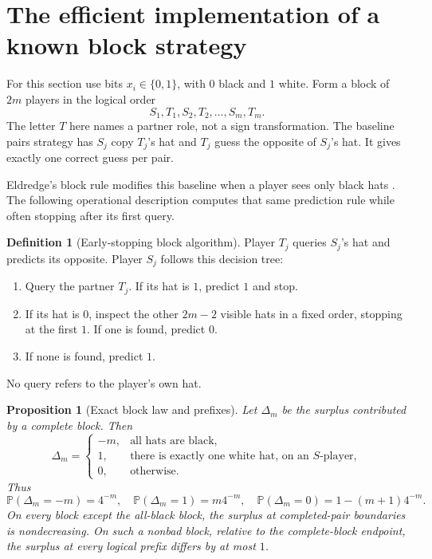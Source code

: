 \documentclass[11pt,letterpaper]{article}
\newtheorem{proposition}[theorem]{Proposition}
\theoremstyle{definition}
\newtheorem{definition}[theorem]{Definition}
\newcommand{\Prb}{\mathbb P}
\begin{document}
\section{The efficient implementation of a known block strategy}
\label{mbg:qry:sec:block}

For this section use bits \(x_i\in\{0,1\}\), with \(0\) black and \(1\)
white. Form a block of \(2m\) players in the logical order
\[
 S_1,T_1,S_2,T_2,\ldots,S_m,T_m.
\]
The letter \(T\) here names a partner role, not a sign transformation.
The baseline pairs strategy has \(S_j\) copy \(T_j\)'s hat and \(T_j\)
guess the opposite of \(S_j\)'s hat. It gives exactly one correct guess
per pair.

Eldredge's block rule modifies this baseline when a player sees only
black hats \cite[Proposition~6.6]{hat:Eldredge}. The following operational
description computes that same prediction rule while often stopping
after its first query.

\begin{definition}[Early-stopping block algorithm]
\label{mbg:qry:def:block}
Player \(T_j\) queries \(S_j\)'s hat and predicts its opposite.
Player \(S_j\) follows this decision tree:
\begin{enumerate}
\item Query the partner \(T_j\). If its hat is \(1\), predict \(1\) and stop.
\item If its hat is \(0\), inspect the other \(2m-2\) visible hats in a
fixed order, stopping at the first \(1\). If one is found, predict \(0\).
\item If none is found, predict \(1\).
\end{enumerate}
No query refers to the player's own hat.
\end{definition}

\begin{proposition}[Exact block law and prefixes]
\label{mbg:qry:prop:blocklaw}
Let \(\Delta_m\) be the surplus contributed by a complete block.
Then
\begin{equation}
 \Delta_m=
 \begin{cases}
 -m,&\text{all hats are black},\\
 1,&\text{there is exactly one white hat, on an \(S\)-player},\\
 0,&\text{otherwise}.
 \end{cases}
 \label{mbg:qry:eq:blocklaw}
\end{equation}
Thus
\begin{equation}
 \Prb(\Delta_m=-m)=4^{-m},\quad
 \Prb(\Delta_m=1)=m4^{-m},\quad
 \Prb(\Delta_m=0)=1-(m+1)4^{-m}.
 \label{mbg:qry:eq:blockprob}
\end{equation}
On every block except the all-black block, the surplus at completed-pair
boundaries is nondecreasing. On such a nonbad block, relative to the
complete-block endpoint, the surplus at every logical prefix differs
by at most \(1\).
\end{proposition}
\end{document}
